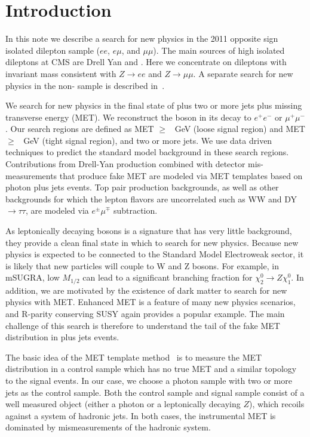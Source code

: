 
\section{Introduction}

In this note we describe a search for new physics in the 2011 
opposite sign isolated dilepton sample ($ee$, $e\mu$, and $\mu\mu$).  
The main sources of high \pt isolated dileptons at CMS are Drell Yan and \ttbar.
Here we concentrate on dileptons with invariant mass consistent
with $Z \to ee$ and $Z \to \mu\mu$.  A separate search for new physics in the non-\Z
sample is described in~\cite{ref:GenericOS}.

We search for new physics in the final state of \Z plus two or more jets plus missing 
transverse energy (MET). We reconstruct the \Z boson
in its decay to $e^+e^-$ or $\mu^+\mu^-$. Our search regions are defined as 
MET $\ge$ \signalmetl~GeV (loose signal region) and MET $\ge$ \signalmett~GeV 
(tight signal region), and two or more jets. We use data driven techniques to predict the
standard model background in these search regions. 
Contributions from Drell-Yan production combined with detector mis-measurements that 
produce fake MET are modeled via MET templates based on photon plus jets events. 
Top pair production backgrounds, as well as other backgrounds for which the lepton
flavors are uncorrelated such as WW and DY$\rightarrow\tau\tau$, are 
modeled via $e^\pm\mu^\mp$ subtraction.

As leptonically decaying \Z bosons is a signature that has very little background, 
they provide a clean final state in which to search for new physics. 
Because new physics is expected to be connected to the Standard Model Electroweak sector, 
it is likely that new particles will couple to W and Z bosons. 
For example, in mSUGRA, low $M_{1/2}$ can lead to a significant branching fraction 
for $\chi_2^0 \rightarrow Z \chi_1^0$. 
In addition, we are motivated by the existence of dark matter to search for new physics with MET.
Enhanced MET is a feature of many new physics scenarios, and R-parity conserving SUSY 
again provides a popular example. The main challenge of this search is therefore to 
understand the tail of the fake MET distribution in \Z plus jets events.

The basic idea of the MET template method~\cite{ref:templates1}\cite{ref:templates2} is 
to measure the MET distribution in a control sample which has no true MET and a similar 
topology to the signal events. 
In our case, we choose a photon sample with two or more jets as the control sample.
Both the control sample and signal sample consist of a well measured object (either a 
photon or a leptonically decaying $Z$), which recoils against a system of hadronic jets. 
In both cases, the instrumental MET is dominated by mismeasurements of the hadronic system. 

